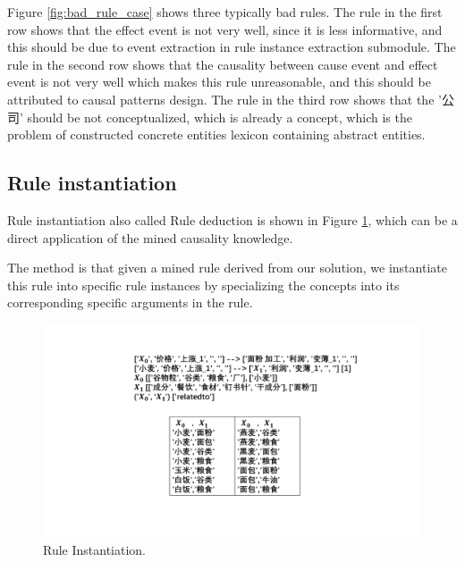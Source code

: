 Figure \ref{fig:bad_rule_case} shows three typically bad rules.
The rule in the first row shows that the effect event is not very well, since it is less informative, and this should be due to event extraction in rule instance extraction submodule.
The rule in the second row shows that the causality between cause event and effect event is not very well which makes this rule unreasonable, and this should be attributed to causal patterns design.
The rule in the third row shows that the '公司' should be not conceptualized, which is already a concept, which is the problem of constructed concrete entities lexicon containing abstract entities.  

	

\subsection{Rule instantiation}
Rule instantiation also called Rule deduction is shown in Figure  \ref{fig:rule_instantiation}, which can be a direct application of the mined causality knowledge.

The method is that given a mined rule derived from our solution, we instantiate this rule into specific rule instances by specializing the concepts into its corresponding specific arguments in the rule. 


\begin{figure}[htbp]
	\centerline{\includegraphics[width=0.9\columnwidth]{figures/instantiation}}
	\caption{Rule Instantiation.}
	\label{fig:rule_instantiation}
\end{figure}





